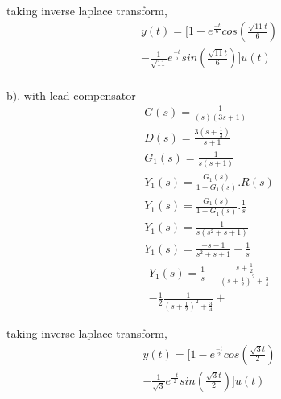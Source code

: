 \begin{enumerate}[label=\thesection.\arabic*.,ref=\thesection.\theenumi]
\begin{equation}
\begin{split}
\end{split}
\end{equation}
taking inverse laplace transform, \\
\begin{equation}
\begin{split}
y(t) = [1 - e^{\frac{-t}{6}}cos(\frac{\sqrt{11}t}{6})\\- \frac{1}{\sqrt{11}}e^{\frac{-t}{6}}sin(\frac{\sqrt{11}t}{6}) ]u(t)
\end{split}
\end{equation}
\\
b). with lead compensator - \\
\begin{align}
G(s) = \frac{1}{(s)(3s+1)}\\
D(s) = \frac{3(s+\frac{1}{3})}{s+1} \\
G_{1}(s) = \frac{1}{s(s+1)}\\
Y_{1}(s) =\frac{G_{1}(s)}{1+G_{1}(s)}.R(s)\\
Y_{1}(s) =\frac{G_{1}(s)}{1+G_{1}(s)}.\frac{1}{s}\\
Y_{1}(s) = \frac{1}{s(s^2+s+1)}\\
Y_{1}(s) = \frac{-s-1}{s^2+s+1} + \frac{1}{s}
\end{align}
\begin{equation}
    \begin{split}
        Y_{1}(s) =  \frac{1}{s} - \frac{s+\frac{1}{2}}{(s+\frac{1}{2})^2+\frac{3}{4}}\\ - \frac{1}{2}\frac{1}{(s+\frac{1}{2})^2+\frac{3}{4}} + 
    \end{split}
\end{equation}

taking inverse laplace transform, \\
\begin{equation}
\begin{split}
y(t) = [1 - e^{\frac{-t}{2}}cos(\frac{\sqrt{3}t}{2})\\- \frac{1}{\sqrt{3}}e^{\frac{-t}{2}}sin(\frac{\sqrt{3}t}{2}) ]u(t)
\end{split}
\end{equation}



\end{enumerate}
